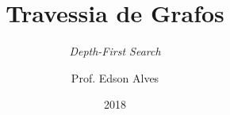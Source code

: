 \title{Travessia de Grafos}
\subtitle{\textit{Depth-First Search}}
\date{2018}
\author{Prof. Edson Alves}

